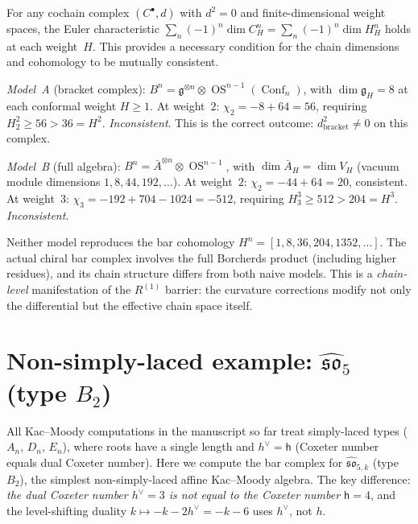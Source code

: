 \begin{remark}
\label{rem:euler-chi-obstruction}

For any cochain complex $(C^\bullet, d)$ with $d^2 = 0$ and
finite-dimensional weight spaces, the Euler characteristic
$\sum_n (-1)^n \dim C^n_H = \sum_n (-1)^n \dim H^n_H$ holds
at each weight~$H$.  This provides a necessary condition for
the chain dimensions and cohomology to be mutually consistent.

\medskip
\noindent\emph{Model~A} (bracket complex): $B^n = \mathfrak{g}^{\otimes n}
\otimes \operatorname{OS}^{n-1}(\operatorname{Conf}_n)$, with
$\dim \mathfrak{g}_H = 8$ at each conformal weight $H \geq 1$.
At weight~$2$: $\chi_2 = -8 + 64 = 56$, requiring
$H^2_2 \geq 56 > 36 = H^2$.  \emph{Inconsistent}.
This is the correct outcome: $d_{\mathrm{bracket}}^2 \neq 0$ on this
complex.

\medskip
\noindent\emph{Model~B} (full algebra): $B^n = \bar{A}^{\otimes n}
\otimes \operatorname{OS}^{n-1}$, with $\dim \bar{A}_H = \dim V_H$
(vacuum module dimensions $1, 8, 44, 192, \ldots$).
At weight~$2$: $\chi_2 = -44 + 64 = 20$, consistent.
At weight~$3$: $\chi_3 = -192 + 704 - 1024 = -512$, requiring
$H^3_3 \geq 512 > 204 = H^3$.  \emph{Inconsistent}.

\medskip
Neither model reproduces the bar cohomology
$H^n = [1, 8, 36, 204, 1352, \ldots]$.  The actual chiral bar
complex involves the full Borcherds product (including higher
residues), and its chain structure differs from both naive
models.  This is a \emph{chain-level} manifestation of the
$R^{(1)}$ barrier: the curvature corrections modify not only the
differential but the effective chain space itself.
\end{remark}


\section{\texorpdfstring{Non-simply-laced example:
$\widehat{\mathfrak{so}}_5$ (type $B_2$)}{Non-simply-laced example:
so-5 (type B-2)}}
\label{sec:B2-details}

All Kac--Moody computations in the manuscript so far treat
simply-laced types ($A_n$, $D_n$, $E_n$), where roots have a single length
and $h^\vee = \mathsf{h}$ (Coxeter number equals dual Coxeter number).  Here we
compute the bar complex for $\widehat{\mathfrak{so}}_{5,k}$ (type $B_2$),
the simplest non-simply-laced affine Kac--Moody algebra.  The key
difference: \emph{the dual Coxeter number $h^\vee = 3$ is not equal
to the Coxeter number $\mathsf{h} = 4$}, and the level-shifting duality
$k \mapsto -k - 2h^\vee = -k - 6$ uses $h^\vee$, not $h$.

